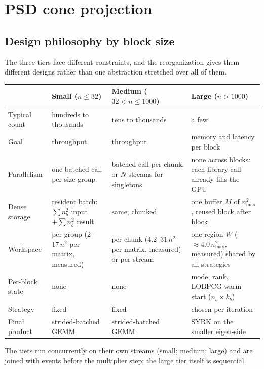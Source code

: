 \documentclass[11pt]{article}
\begin{document}
\section{PSD cone projection}\label{sec:psd}

\subsection{Design philosophy by block size}\label{sec:psd-philosophy}
The three tiers face different constraints, and the reorganization gives them different designs rather
than one abstraction stretched over all of them.
\begin{center}\small
\begin{tabularx}{\textwidth}{@{}l>{\raggedright\arraybackslash}X>{\raggedright\arraybackslash}X>{\raggedright\arraybackslash}X@{}}
\toprule
 & Small ($n\le32$) & Medium ($32<n\le1000$) & Large ($n>1000$) \\
\midrule
Typical count & hundreds to thousands & tens to thousands & a few \\
Goal & throughput & throughput & memory and latency per block \\
Parallelism & one batched call per size group & batched call per chunk, or $N$ streams for singletons & none across blocks: each library call already fills the GPU \\
Dense storage & resident batch: $\sum n_b^2$ input $+\sum n_b^2$ result & same, chunked & one buffer $M$ of $n_{\max}^2$, reused block after block \\
Workspace & per group ($2$--$17\,n^2$ per matrix, measured) & per chunk ($4.2$--$31\,n^2$ per matrix, measured) or per stream & one region $W$ ($\approx4.0\,n_{\max}^2$, measured) shared by all strategies \\
Per-block state & none & none & mode, rank, LOBPCG warm start ($n_b\times k_b$) \\
Strategy & fixed & fixed & chosen per iteration \\
Final product & strided-batched GEMM & strided-batched GEMM & SYRK on the smaller eigen-side \\
\bottomrule
\end{tabularx}
\end{center}
The tiers run concurrently on their own streams (small; medium; large) and are joined with events before
the multiplier step; the large tier itself is sequential.
\end{document}
